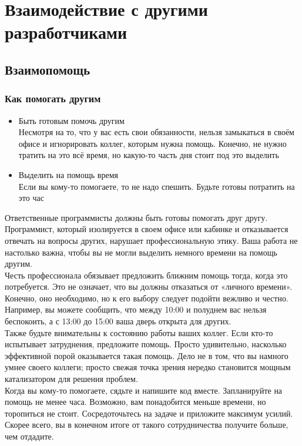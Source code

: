 \documentclass{../industrial-development}
\begin{document}
\section{Взаимодействие с другими разработчиками}
\subsection{Взаимопомощь}
\begin{frame} \frametitle{Как помогать другим}
\begin{itemize}
  \item Быть готовым помочь другим\\
	Несмотря на то, что у вас есть свои обязанности, нельзя замыкаться в своём офисе и игнорировать коллег, которым нужна помощь. Конечно, не нужно тратить на это всё время, но какую-то часть дня стоит под это выделить
  \item Выделить на помощь время\\
	Если вы кому-то помогаете, то не надо спешить. Будьте готовы потратить на это час
\end{itemize}
\end{frame}
\lecturenotes
Ответственные программисты должны быть готовы помогать друг другу. Программист, который изолируется в своем офисе или кабинке и отказывается отвечать на вопросы других, нарушает профессиональную этику. Ваша работа не настолько важна, чтобы вы не могли выделить немного времени на помощь другим.\\
Честь профессионала обязывает предложить ближним помощь тогда, когда это потребуется. Это не означает, что вы должны отказаться от «личного времени». Конечно, оно необходимо, но к его выбору следует подойти вежливо и честно. Например, вы можете сообщить, что между 10:00 и полуднем вас нельзя беспокоить, а с 13:00 до 15:00 ваша дверь открыта для других.\\
Также будьте внимательны к состоянию работы ваших коллег. Если кто-то испытывает затруднения, предложите помощь. Просто удивительно, насколько эффективной порой оказывается такая помощь. Дело не в том, что вы намного умнее своего коллеги; просто свежая точка зрения нередко становится мощным катализатором для решения проблем.\\
Когда вы кому-то помогаете, сядьте и напишите код вместе. Запланируйте на помощь не менее часа. Возможно, вам понадобится меньше времени, но торопиться не стоит. Сосредоточьтесь на задаче и приложите максимум усилий. Скорее всего, вы в конечном итоге от такого сотрудничества получите больше, чем отдадите.
\end{document}
